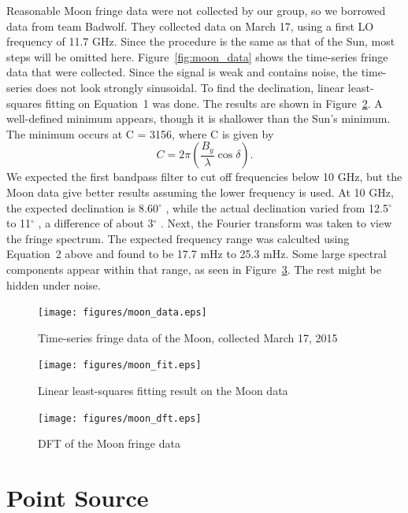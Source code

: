 \documentclass[12pt]{article}
\newcommand{\degree}{\ensuremath{^\circ} }
\begin{document}
Reasonable Moon fringe data were not collected by our group, so we borrowed data from team Badwolf.
They collected data on March 17, using a first LO frequency of 11.7 GHz.
Since the procedure is the same as that of the Sun, most steps will be omitted here.
Figure~\ref{fig:moon_data} shows the time-series fringe data that were collected.
Since the signal is weak and contains noise, the time-series does not look strongly sinusoidal.
To find the declination, linear least-squares fitting on Equation~1 was done.
The results are shown in Figure~\ref{fig:moon_fit}.
A well-defined minimum appears, though it is shallower than the Sun's minimum.
The minimum occurs at C = 3156, where C is given by
\begin{equation}
C = 2 \pi \left( \frac{B_y}{\lambda} \cos \delta \right).
\end{equation}
We expected the first bandpass filter to cut off frequencies below 10 GHz, but the Moon data give better results assuming the lower frequency is used.
At 10 GHz, the expected declination is 8.60\degree, while the actual declination varied from 12.5\degree to 11\degree, a difference of about 3\degree.
Next, the Fourier transform was taken to view the fringe spectrum.
The expected frequency range was calculted using Equation~2 above and found to be 17.7 mHz to 25.3 mHz.
Some large spectral components appear within that range, as seen in Figure~\ref{fig:moon_dft}.
The rest might be hidden under noise.

\begin{figure}
\centering
\texttt{[image: figures/moon\_data.eps]}
\caption{Time-series fringe data of the Moon, collected March 17, 2015}
\label{fig:moon_time}
\end{figure}

\begin{figure}
\centering
\texttt{[image: figures/moon\_fit.eps]}
\caption{Linear least-squares fitting result on the Moon data}
\label{fig:moon_fit}
\end{figure}

\begin{figure}
\centering
\texttt{[image: figures/moon\_dft.eps]}
\caption{DFT of the Moon fringe data}
\label{fig:moon_dft}
\end{figure}



\section{Point Source}
\end{document}
